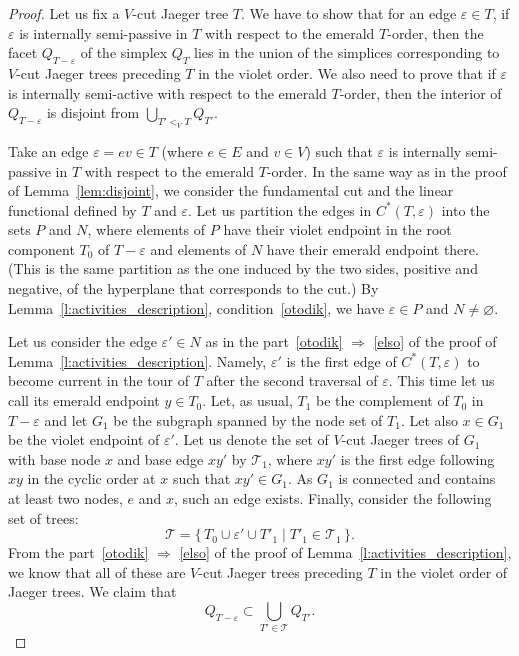 \documentclass[ALCO,ThmDefs,Unicode,epreuves]{cedram}
\begin{document}
\begin{proof}
Let us fix a $V$-cut Jaeger tree $T$. We have to show that for an edge $\varepsilon\in T$, if $\varepsilon$ is internally semi-passive in $T$ with respect to the emerald $T$-order, then the facet $Q_{T-\varepsilon}$ of the simplex $Q_T$ lies in the union of the simplices corresponding to $V$-cut Jaeger trees preceding $T$ in the violet order. We also need to prove that if $\varepsilon$ is internally semi-active with respect to the emerald $T$-order, then the interior of $Q_{T-\varepsilon}$ is disjoint from $\bigcup_{T'<_V T}Q_{T'}$.

Take an edge $\varepsilon=ev \in T$ (where $e\in E$ and $v\in V$) such that $\varepsilon$ is internally semi-passive in $T$ with respect to the emerald $T$-order. In the same way as in the proof of Lemma~\ref{lem:disjoint}, we consider the fundamental cut and the linear functional defined by $T$ and $\varepsilon$. Let us partition the edges in $C^*(T,\varepsilon)$ into the sets $P$ and $N$, where elements of $P$ have their violet endpoint in the root component $T_0$ of $T-\varepsilon$ and elements of $N$ have their emerald endpoint there. (This is the same partition as the one induced by the two sides, positive and negative, of the hyperplane that corresponds to the cut.) By Lemma~\ref{l:activities_description}, condition~\ref{otodik}, we have $\varepsilon\in P$ and $N\neq \varnothing$. 

Let us consider the edge $\varepsilon'\in N$ as in the part~\ref{otodik} $\Rightarrow$ \ref{elso} of the proof of Lemma~\ref{l:activities_description}. Namely, $\varepsilon'$ is the first edge of $C^*(T,\varepsilon)$ to become current in the tour of $T$ after the second traversal of $\varepsilon$. This time let us call its emerald endpoint $y\in T_0$. Let, as usual, $T_1$ be the complement of $T_0$ in $T-\varepsilon$ and let $G_1$ be the subgraph spanned by the node set of $T_1$. Let also $x\in G_1$ be the violet endpoint of $\varepsilon'$. Let us denote the set of $V$-cut Jaeger trees of $G_1$ with base node $x$ and base edge $xy'$ by $\mathcal{T}_1$, where $xy'$ is the first edge following $xy$ in the cyclic order at $x$ such that $xy'\in G_1$. As $G_1$ is connected and contains at least two nodes, $e$ and $x$, such an edge exists. Finally, consider the following set of trees: 
\begin{equation}
\label{eq:sokfa}
\mathcal{T}=\{\,T_0\cup \varepsilon' \cup T'_1\mid T'_1 \in \mathcal{T}_1\,\}.
\end{equation}
From the part~\ref{otodik} $\Rightarrow$ \ref{elso} of the proof of Lemma~\ref{l:activities_description}, we know that all of these are $V$-cut Jaeger trees preceding $T$ in the violet order of Jaeger trees. We claim that 
\begin{equation*}
Q_{T-\varepsilon}\subset \bigcup_{T'\in \mathcal{T}}Q_{T'}.
\end{equation*}


\end{proof}
\end{document}
